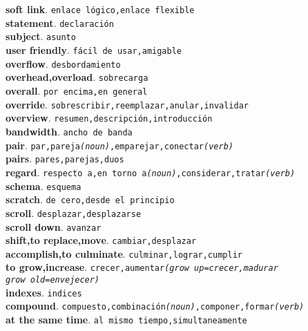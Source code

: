 \documentclass[twocolumn]{article}
\begin{document}
	\textsf{\textbf{soft link}}. \texttt{enlace l\'ogico,enlace flexible}\\
	\textsf{\textbf{statement}}. \texttt{declaraci\'on}\\
	\textsf{\textbf{subject}}. \texttt{asunto}\\
	\textsf{\textbf{user friendly}}. \texttt{f\'acil de usar,amigable}\\
	\textsf{\textbf{overflow}}. \texttt{desbordamiento}\\
	\textsf{\textbf{overhead,overload}}. \texttt{sobrecarga}\\
	\textsf{\textbf{overall}}. \texttt{por encima,en general}\\
	\textsf{\textbf{override}}. \texttt{sobrescribir,reemplazar,anular,invalidar}\\
	\textsf{\textbf{overview}}. \texttt{resumen,descripci\'on,introducci\'on}\\
	\textsf{\textbf{bandwidth}}. \texttt{ancho de banda}\\
	\textsf{\textbf{pair}}. \texttt{par,pareja{\scriptsize \textsl{(noun)}},emparejar,conectar{\scriptsize \textsl{(verb)}}}\\
	\textsf{\textbf{pairs}}. \texttt{pares,parejas,duos}\\
	\textsf{\textbf{regard}}. \texttt{respecto a,en torno a{\scriptsize \textsl{(noun)}},considerar,tratar{\scriptsize \textsl{(verb)}}}\\
	\textsf{\textbf{schema}}. \texttt{esquema}\\
	\textsf{\textbf{scratch}}. \texttt{de cero,desde el principio}\\
	\textsf{\textbf{scroll}}. \texttt{desplazar,desplazarse}\\
	\textsf{\textbf{scroll down}}. \texttt{avanzar}\\
	\textsf{\textbf{shift,to replace,move}}. \texttt{cambiar,desplazar}\\
	\textsf{\textbf{accomplish,to culminate}}. \texttt{culminar,lograr,cumplir}\\
	\textsf{\textbf{to grow,increase}}. \texttt{crecer,aumentar{\scriptsize \textsl{(grow up=crecer,madurar\\grow old=envejecer)}}}\\
	\textsf{\textbf{indexes}}. \texttt{indices}\\
	\textsf{\textbf{compound}}. \texttt{compuesto,combinaci\'on{\scriptsize \textsl{(noun)}},componer,formar{\scriptsize \textsl{(verb)}}}\\
	\textsf{\textbf{at the same time}}. \texttt{al mismo tiempo,simultaneamente}\\
\end{document}
